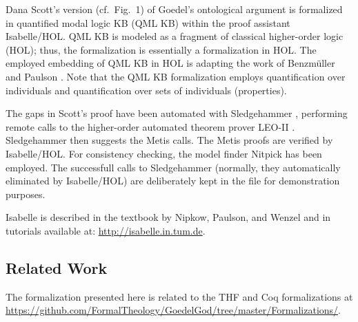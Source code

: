 %
\begin{isabellebody}%
\def\isabellecontext{GoedelGod}%
%
\isadelimtheory
%
\endisadelimtheory
%
\isatagtheory
%
\endisatagtheory
{\isafoldtheory}%
%
\isadelimtheory
%
\endisadelimtheory
%
\isamarkuptrue%
%
\begin{isamarkuptext}%
Dana Scott's version \cite{ScottNotes} (cf.~Fig.~1)
 of Goedel's ontological argument \cite{GoedelNotes} is 
 formalized in quantified modal logic KB (QML KB) within the proof assistant Isabelle/HOL. 
 QML KB is  modeled as a fragment of classical higher-order logic (HOL); 
 thus, the formalization is essentially a formalization in HOL. The employed embedding 
 of QML KB in HOL is adapting the work of Benzm\"uller and Paulson \cite{J23,B9}.
 Note that the QML KB formalization employs quantification over individuals and 
 quantification over sets of individuals (properties).

 The gaps in Scott's proof have been automated 
 with Sledgehammer \cite{Sledgehammer}, performing remote calls to the higher-order automated
 theorem prover LEO-II \cite{LEO-II}. Sledgehammer then suggests the 
 Metis \cite{Metis} calls. The Metis proofs are verified by Isabelle/HOL.
 For consistency checking, the model finder Nitpick \cite{Nitpick} has been employed.
 The successfull calls to Sledgehammer (normally, they automatically eliminated by Isabelle/HOL)
 are deliberately kept in the file for demonstration purposes.
 
 Isabelle is described in the textbook by Nipkow, 
 Paulson, and Wenzel \cite{Isabelle} and in tutorials available 
 at: \url{http://isabelle.in.tum.de}.
 
\subsection{Related Work}

 The formalization presented here is related to the THF \cite{J22} and 
 Coq \cite{Coq} formalizations at 
 \url{https://github.com/FormalTheology/GoedelGod/tree/master/Formalizations/}.
 

\end{isamarkuptext}
\end{isabellebody}

